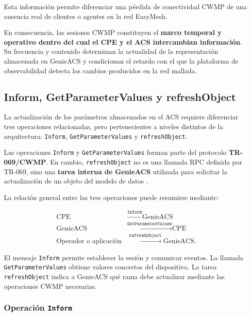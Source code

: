 Esta información permite diferenciar una pérdida de conectividad CWMP de
una ausencia real de clientes o agentes en la red EasyMesh.

En consecuencia, las sesiones CWMP constituyen el
\textbf{marco temporal y operativo dentro del cual el CPE y el ACS
intercambian información}. Su frecuencia y contenido determinan la
actualidad de la representación almacenada en GenieACS y condicionan el
retardo con el que la plataforma de observabilidad detecta los cambios
producidos en la red mallada.

\subsection{Inform, GetParameterValues y refreshObject}
\label{subsec:inform-getparametervalues-refreshobject}

La actualización de los parámetros almacenados en el ACS requiere
diferenciar tres operaciones relacionadas, pero pertenecientes a niveles
distintos de la arquitectura: \texttt{Inform},
\texttt{GetParameterValues} y \texttt{refreshObject}.

Las operaciones \texttt{Inform} y \texttt{GetParameterValues} forman
parte del protocolo \textbf{TR-069/CWMP}. En cambio,
\texttt{refreshObject} no es una llamada RPC definida por TR-069, sino
una \textbf{tarea interna de GenieACS} utilizada para solicitar la
actualización de un objeto del modelo de datos
\cite{bbf_tr069,genieacs_api}.

La relación general entre las tres operaciones puede resumirse mediante:

\[
\begin{aligned}
    \text{CPE}
    &\xrightarrow{\texttt{Inform}}
    \text{GenieACS}\\
    \text{GenieACS}
    &\xrightarrow{\texttt{GetParameterValues}}
    \text{CPE}\\
    \text{Operador o aplicación}
    &\xrightarrow{\texttt{refreshObject}}
    \text{GenieACS}.
\end{aligned}
\]

El mensaje \texttt{Inform} permite establecer la sesión y comunicar
eventos. La llamada \texttt{GetParameterValues} obtiene valores concretos
del dispositivo. La tarea \texttt{refreshObject} indica a GenieACS qué
rama debe actualizar mediante las operaciones CWMP necesarias.


\subsubsection*{Operación \texttt{Inform}}

